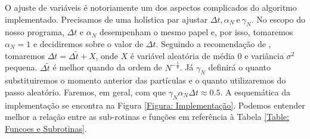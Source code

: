 \documentclass[12pt]{report}
\begin{document}
O ajuste de variáveis é notoriamente um dos aspectos complicados do algoritmo implementado. Precisamos de uma holística par ajustar $\Delta t, \alpha_N \ \text{e} \ \gamma_N$. No escopo do nosso programa, $\Delta t$ e $\alpha_N$ desempenham o mesmo papel e, por isso, tomaremos $\alpha_N = 1$ e decidiremos sobre o valor de $\Delta t$. Seguindo a recomendação de \cite[Capítulo~5]{handbookmontecarlo}, tomaremos $\Delta t = \Delta\tilde{t} + X$, onde $X$ é variável aleatória de média $0$ e variância $\sigma^2$ pequena. $\Delta \tilde{t}$ é melhor quando da ordem de $N^{-\frac{1}{4}}$. Já $\gamma_N$ definirá o quanto substituiremos o momento anterior das partículas e o quanto utilizaremos do passo aleatório. Faremos, em geral, com que $\gamma_N \alpha_N \Delta t \approx 0.5$.  A esquemática da implementação se encontra na Figura \ref{Figura: Implementação}. Podemos entender melhor a relação entre as sub-rotinas e funções em referência à Tabela \ref{Table: Funcoes e Subrotinas}.
\end{document}
